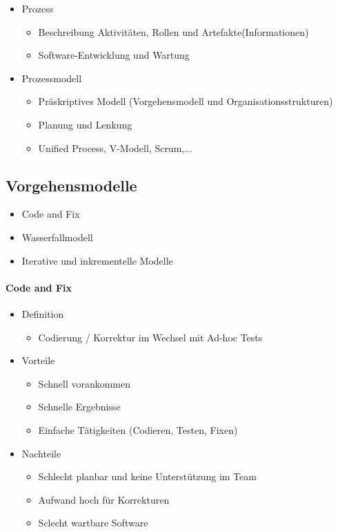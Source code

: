 \documentclass[../ZF_SWEN1.tex]{subfiles}
\begin{document}
\begin{itemize}
    \item Prozess
    \begin{itemize}
        \item Beschreibung Aktivitäten, Rollen und Artefakte(Informationen)
        \item Software-Entwicklung und Wartung
    \end{itemize}
    \item Prozessmodell
    \begin{itemize}
        \item Präskriptives Modell (Vorgehensmodell und Organisationsstrukturen)
        \item Planung und Lenkung
        \item Unified Process, V-Modell, Scrum,...
    \end{itemize}
\end{itemize}
\subsection{Vorgehensmodelle}
\begin{itemize}
    \item Code and Fix
    \item Wasserfallmodell
    \item Iterative und inkrementelle Modelle
\end{itemize}

\paragraph{Code and Fix}
\begin{itemize}
    \item Definition
    \begin{itemize}
        \item Codierung / Korrektur im Wechsel mit Ad-hoc Tests
    \end{itemize}
    \item Vorteile
    \begin{itemize}
        \item Schnell vorankommen
        \item Schnelle Ergebnisse
        \item Einfache Tätigkeiten (Codieren, Testen, Fixen)
    \end{itemize}
    \item Nachteile
    \begin{itemize}
        \item Schlecht planbar und keine Unterstützung im Team
        \item Aufwand hoch für Korrekturen
        \item Sclecht wartbare Software
    \end{itemize}
\end{itemize}
\end{document}

